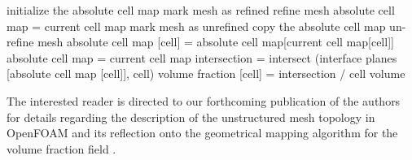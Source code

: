 \begin{algorithm}[H]
    \centering
    \caption{Geometrical mapping algorithm for the volume fraction field}
    \label{alg:geometrical-mapping}

    {\small
      \begin{algorithmic}
        \State initialize the absolute cell map 
           \State mark mesh as refined
            \State refine mesh 
            \State absolute cell map = current cell map
        \EndIf
           \State mark mesh as unrefined 
           \State copy the absolute cell map 
           \State un-refine mesh 
        \EndIf
               \State absolute cell map [cell] = absolute cell map[current cell map[cell]]
            \EndFor
            \State absolute cell map = current cell map
        \EndIf
            \State intersection = intersect (interface planes [absolute cell map [cell]], cell) 
            \State volume fraction [cell] = intersection / cell volume 
        \EndFor
      \end{algorithmic}
    }
\end{algorithm}

The interested reader is directed to our forthcoming publication of the authors for details
regarding the description of the unstructured mesh topology in OpenFOAM and its
reflection onto the geometrical mapping algorithm for the volume fraction field
\citep*{MaricVoFoamMapping2013}.
